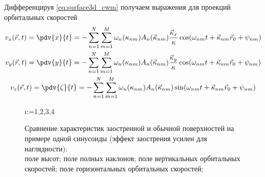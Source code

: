 Дифференцируя \eqref{eq:surface3d_cwm} получаем выражения для
проекций орбитальных
скоростей 
\begin{equation}
    \begin{gathered}
        \label{eq:orbital_velocity}
        v_x(\vec r, t)  = \pdv{x}{t} = - \fullsum \omega_n(\kappa_{nm}) A_n(\vec
        \kappa_{nm}) \frac{\vec \kappa_x}{\kappa} \cos(\fullphase) \\
        v_y (\vec r, t) = \pdv{y}{t} = - \fullsum \omega_n(\kappa_{nm}) A_n(\vec
        \kappa_{nm}) \frac{\vec \kappa_y}{\kappa}\cos(\fullphase) \\
        v_z (\vec r, t) = \pdv{\zeta}{t} = - \fullsum \omega_n(\kappa_{nm})
        A_n(\vec \kappa_{nm})
        \sin(\fullphase)
    \end{gathered}
\end{equation}




\begin{figure}[h]
\centering
\makeatletter
    \@for\i:={1,2,3,4}

\label{fig:cwm_demo}
\caption{
    Сравнение характеристик заостренной и обычной поверхностей на примере одной
    синусоиды (эффект заострения усилен для наглядности): \\
     поле высот;
     поле полных наклонов;
     поле вертикальных орбитальных скоростей;
     поле горизонтальных орбитальных скоростей;
}
\makeatother
\end{figure}





